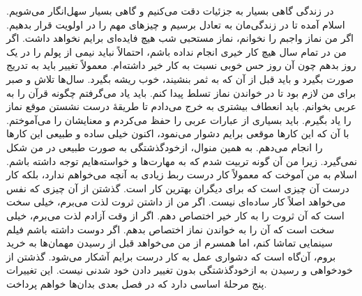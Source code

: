 در زندگی گاهی بسیار به جزئیات دقت می‌کنیم و گاهی بسیار سهل‌انگار می‌شویم. اسلام آمده تا در زندگی‌مان به تعادل برسیم و چیزهای مهم را در اولویت قرار بدهیم. اگر من نماز واجبم را نخوانم، نماز مستحبی شب هیچ فایده‌ای برایم نخواهد داشت. اگر من در تمام سال هیچ کار خیری انجام نداده باشم، احتمالاً نباید نیمی از پولم را در یک روز بدهم چون آن روز حس خوبی نسبت به کار خیر داشته‌ام. معمولاً تغییر باید به تدریج صورت بگیرد و باید قبل از آن که به ثمر بنشیند، خوب ریشه بگیرد. سال‌ها تلاش و صبر برای من لازم بود تا در خواندن نماز تسلط پیدا کنم. باید یاد می‌گرفتم چگونه قرآن را به عربی بخوانم. باید انعطاف بیشتری به خرج می‌دادم تا طریقهٔ‌ درست نشستن موقع نماز را یاد بگیرم. باید بسیاری از عبارات عربی را حفظ می‌کردم و معنایشان را می‌آموختم. با آن که این کارها موقعی برایم دشوار می‌نمود، اکنون خیلی ساده و طبیعی این کارها را انجام می‌دهم. به همین منوال، ازخودگذشتگی به صورت طبیعی در من شکل نمی‌گیرد. زیرا من آن گونه تربیت شدم که به مهارت‌ها و خواسته‌هایم توجه داشته باشم. اسلام به من آموخت که معمولاً کار درست ربط زیادی به آنچه می‌خواهم ندارد، بلکه کار درست آن چیزی است که برای دیگران بهترین کار است. گذشتن از آن چیزی که نفس می‌خواهد اصلاً کار ساده‌ای نیست. اگر من از داشتن ثروت لذت می‌برم، خیلی سخت است که آن ثروت را به کار خیر اختصاص دهم. اگر از وقت آزادم لذت می‌برم، خیلی سخت است که آن را به خواندن نماز اختصاص بدهم. اگر دوست داشته باشم فیلم سینمایی تماشا کنم، اما همسرم از من می‌خواهد قبل از رسیدن مهمان‌ها به خرید بروم، آن‌گاه است که دشواری عمل به کار درست برایم آشکار می‌شود. گذشتن از خودخواهی و رسیدن به ازخودگذشتگی بدون تغییر دادن خود شدنی نیست. این تغییرات پنج مرحلهٔ اساسی دارد که در فصل بعدی بدان‌ها خواهم پرداخت.


